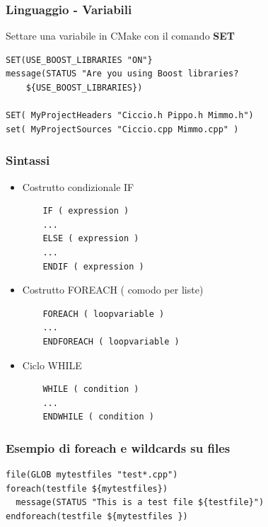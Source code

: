 \documentclass[10pt] {beamer}
\begin{document}

\begin{frame}[fragile]
 \frametitle{Linguaggio - Variabili}
Settare una variabile in CMake con il comando \textbf{SET}
\begin{verbatim}
SET(USE_BOOST_LIBRARIES "ON"}
message(STATUS "Are you using Boost libraries? 
    ${USE_BOOST_LIBRARIES})

SET( MyProjectHeaders "Ciccio.h Pippo.h Mimmo.h")
set( MyProjectSources "Ciccio.cpp Mimmo.cpp" )
\end{verbatim}
\end{frame}



\begin{frame}[fragile]
	\frametitle{Sintassi}
\begin{itemize}
 \item Costrutto condizionale IF
	\begin{verbatim}
	IF ( expression )
	...
	ELSE ( expression )
	...
	ENDIF ( expression )
	\end{verbatim}
\item Costrutto FOREACH ( comodo per liste)
	\begin{verbatim}
	FOREACH ( loopvariable )
	...
	ENDFOREACH ( loopvariable )
	\end{verbatim}
\item Ciclo WHILE
	\begin{verbatim}
	WHILE ( condition )
	...
	ENDWHILE ( condition )
	\end{verbatim}
\end{itemize}
\end{frame}


\begin{frame}[fragile]
\frametitle{Esempio di foreach e wildcards su files}
\begin{verbatim}
file(GLOB mytestfiles "test*.cpp")
foreach(testfile ${mytestfiles})
  message(STATUS "This is a test file ${testfile}")
endforeach(testfile ${mytestfiles })
\end{verbatim}
\end{frame}

\end{document}
